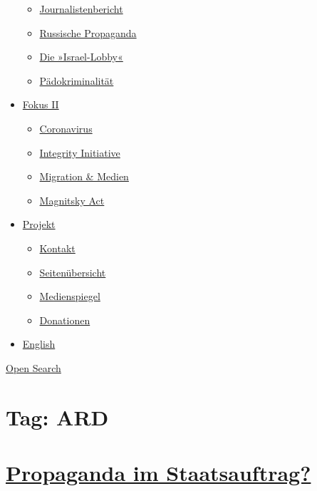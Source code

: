 \begin{itemize}
  \begin{itemize}
  \tightlist
  \item
    \href{https://swprs.org/bericht-eines-journalisten/}{Journalistenbericht}
  \item
    \href{https://swprs.org/russische-propaganda/}{Russische Propaganda}
  \item
    \href{https://swprs.org/die-israel-lobby-fakten-und-mythen/}{Die
    »Israel-Lobby«}
  \item
    \href{https://swprs.org/geopolitik-und-paedokriminalitaet/}{Pädokriminalität}
  \end{itemize}
\item
  \href{https://swprs.org/migration-und-medien/}{Fokus II}

  \begin{itemize}
  \tightlist
  \item
    \href{https://swprs.org/covid-19-hinweis-ii/}{Coronavirus}
  \item
    \href{https://swprs.org/die-integrity-initiative/}{Integrity
    Initiative}
  \item
    \href{https://swprs.org/migration-und-medien/}{Migration \& Medien}
  \item
    \href{https://swprs.org/der-fall-magnitsky/}{Magnitsky Act}
  \end{itemize}
\item
  \href{https://swprs.org/kontakt/}{Projekt}

  \begin{itemize}
  \tightlist
  \item
    \href{https://swprs.org/kontakt/}{Kontakt}
  \item
    \href{https://swprs.org/uebersicht/}{Seitenübersicht}
  \item
    \href{https://swprs.org/medienspiegel/}{Medienspiegel}
  \item
    \href{https://swprs.org/donationen/}{Donationen}
  \end{itemize}
\item
  \href{https://swprs.org/contact/}{English}
\end{itemize}

\protect\hyperlink{}{Open Search}

\hypertarget{tag-ard}{%
\section{Tag: ARD}\label{tag-ard}}

\hypertarget{propaganda-im-staatsauftrag}{%
\section{\texorpdfstring{\href{https://swprs.org/2017/03/01/propaganda-im-staatsauftrag/}{Propaganda
im
Staatsauftrag?}}{Propaganda im Staatsauftrag?}}\label{propaganda-im-staatsauftrag}}


